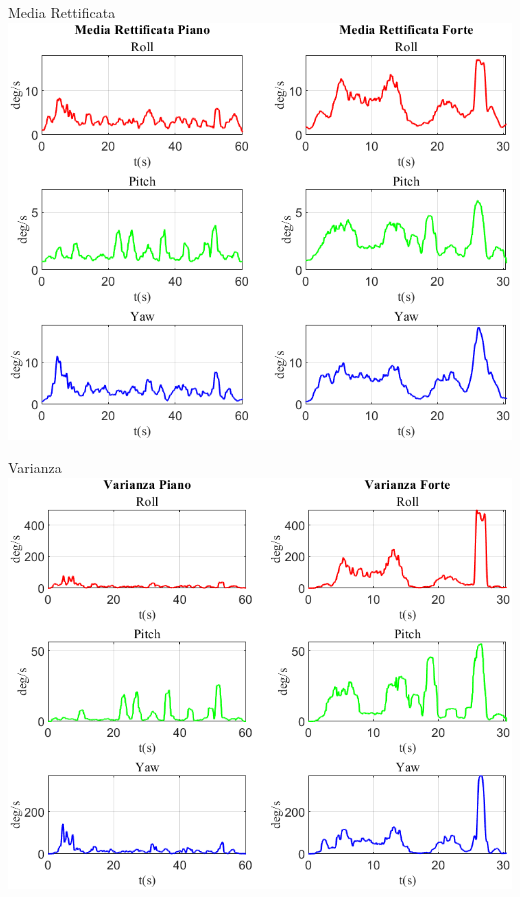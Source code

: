 \documentclass[beamer]{standalone}
\begin{document}
	\begin{frame}{{Media Rettificata}}
		\centering\includegraphics[height=.8\textheight]{figure/VAng/Media Rettificata}
	\end{frame}
	
	\begin{frame}{{Varianza}}
		\centering\includegraphics[height=.8\textheight]{figure/VAng/Varianza}
	\end{frame}
	
	
\end{document}
